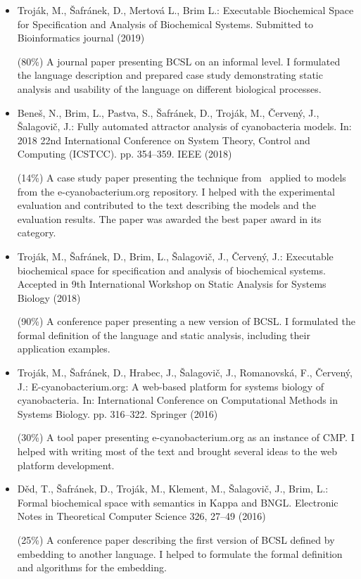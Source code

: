 \documentclass[11pt,a4paper]{report}
\begin{document}
\begin{itemize}

\item Troják, M., Šafránek, D., Mertová L., Brim L.: Executable Biochemical Space for Specification and Analysis of Biochemical Systems. Submitted to Bioinformatics journal (2019)

(80\%) A journal paper presenting BCSL on an informal level. I formulated the language description and prepared case study demonstrating static analysis and usability of the language on different biological processes.

\item Beneš, N., Brim, L., Pastva, S., Šafránek, D., Troják, M., Červený, J., Šalagovič, J.: Fully automated attractor analysis of cyanobacteria models. In: 2018 22nd International Conference on System Theory, Control and Computing (ICSTCC). pp. 354--359. IEEE (2018)

(14\%) A case study paper presenting the technique from~\cite{barnat2017detecting} applied to models from the e-cyanobacterium.org repository. I helped with the experimental evaluation and contributed to the text describing the models and the
evaluation results. The paper was awarded the best paper award in its category.

\item Troják, M., Šafránek, D., Brim, L., Šalagovič, J., Červený, J.: Executable biochemical space for specification and analysis of biochemical systems. Accepted in 9th International Workshop on Static Analysis for Systems Biology (2018)

(90\%) A conference paper presenting a new version of BCSL. I formulated the formal definition of the language and static analysis, including their application examples.

\item Troják, M., Šafránek, D., Hrabec, J., Šalagovič, J., Romanovská, F., Červený, J.: E-cyanobacterium.org: A web-based platform for systems biology of cyanobacteria. In: International Conference on Computational Methods in Systems Biology. pp. 316--322. Springer (2016)

(30\%) A tool paper presenting e-cyanobacterium.org as an instance of CMP. I helped with writing most of the text and brought several ideas to the web platform development.

\item Děd, T., Šafránek, D., Troják, M., Klement, M., Šalagovič, J., Brim, L.: Formal biochemical space with semantics in Kappa and BNGL. Electronic Notes in Theoretical Computer Science 326, 27–49 (2016)

(25\%) A conference paper describing the first version of BCSL defined by embedding to another language. I helped to formulate the formal definition and algorithms for the embedding.

\end{itemize}
\end{document}

